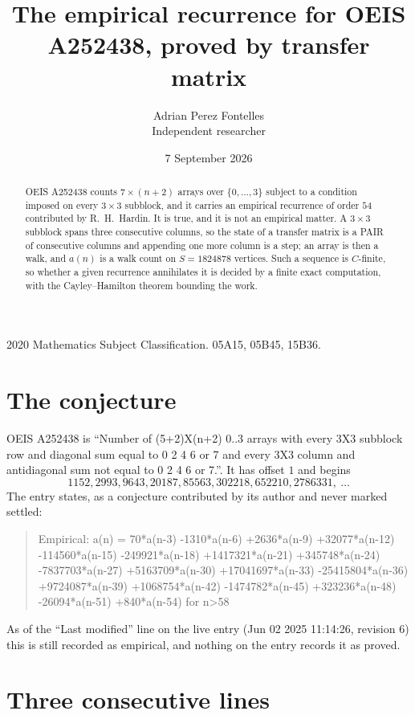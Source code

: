 \documentclass[11pt,a4paper]{article}
\title{The empirical recurrence for OEIS A252438, proved by transfer matrix}
\author{Adrian Perez Fontelles\\ \small Independent researcher}
\date{7 September 2026}
\theoremstyle{plain}
\theoremstyle{definition}
\begin{document}
\maketitle

\begin{abstract}
OEIS A252438 counts $7\times(n+2)$ arrays over $\{0,\dots,3\}$ subject to a condition imposed on
every $3\times3$ subblock, and it carries an empirical recurrence of order $54$
contributed by R.~H.~Hardin. It is true, and it is not an empirical matter. A $3\times3$
subblock spans three consecutive columns, so the state of a transfer matrix is a PAIR of
consecutive columns and appending one more column is a step; an array is then a walk, and
$a(n)$ is a walk count on $S=1824878$ vertices. Such a sequence is $C$-finite, so whether a given
recurrence annihilates it is decided by a finite exact computation, with the Cayley--Hamilton
theorem bounding the work.
\end{abstract}

\noindent\small 2020 Mathematics Subject Classification. 05A15, 05B45, 15B36.\normalsize

\section{The conjecture}

OEIS A252438 is ``Number of (5+2)X(n+2) 0..3 arrays with every 3X3 subblock row and diagonal sum equal to 0 2 4 6 or 7 and every 3X3 column and antidiagonal sum not equal to 0 2 4 6 or 7.''. It has offset $1$ and begins
\[
1152, 2993, 9643, 20187, 85563, 302218, 652210, 2786331,\ \dots
\]
The entry states, as a conjecture contributed by its author and never marked settled:
\begin{quote}
Empirical: a(n) = 70*a(n-3) -1310*a(n-6) +2636*a(n-9) +32077*a(n-12) -114560*a(n-15) -249921*a(n-18) +1417321*a(n-21) +345748*a(n-24) -7837703*a(n-27) +5163709*a(n-30) +17041697*a(n-33) -25415804*a(n-36) +9724087*a(n-39) +1068754*a(n-42) -1474782*a(n-45) +323236*a(n-48) -26094*a(n-51) +840*a(n-54) for n>58
\end{quote}
As of the ``Last modified'' line on the live entry (Jun 02 2025 11:14:26, revision 6) this is still
recorded as empirical, and nothing on the entry records it as proved.

\section{Three consecutive lines}
\end{document}
